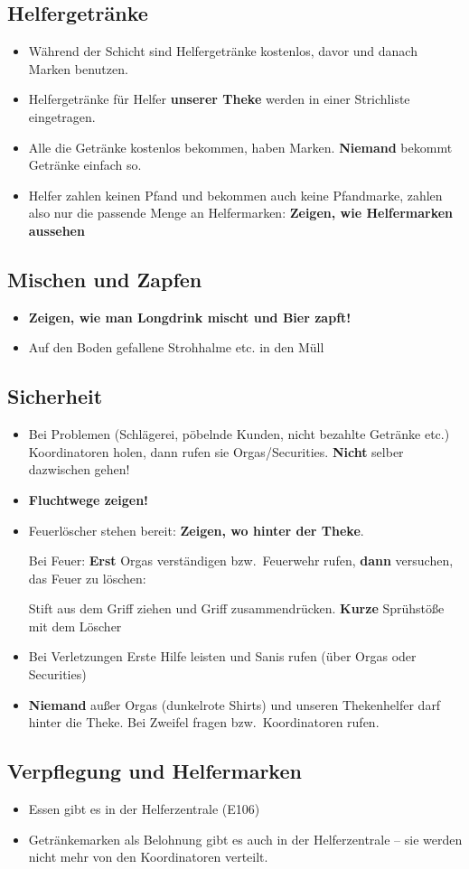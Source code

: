 \subsection{Helfergetränke}
\begin{itemize}
  \renewcommand{\labelitemi}{$\Box$}
  \item Während der Schicht sind Helfergetränke kostenlos, davor und danach Marken benutzen.
  \item Helfergetränke für Helfer \textbf{unserer Theke} werden in einer Strichliste eingetragen.
  \item Alle die Getränke kostenlos bekommen, haben Marken. \textbf{Niemand} bekommt Getränke einfach so.
  \item Helfer zahlen keinen Pfand und bekommen auch keine Pfandmarke, zahlen also nur die passende Menge an Helfermarken: \textbf{Zeigen, wie Helfermarken aussehen}
\end{itemize}
\subsection{Mischen und Zapfen}
\begin{itemize}
  \renewcommand{\labelitemi}{$\Box$}
  \item \textbf{Zeigen, wie man Longdrink mischt und Bier zapft!}
  \item Auf den Boden gefallene Strohhalme etc. in den Müll
\end{itemize}
\subsection{Sicherheit}
\begin{itemize}
  \renewcommand{\labelitemi}{$\Box$}
  \item Bei Problemen (Schlägerei, pöbelnde Kunden, nicht bezahlte Getränke etc.) Koordinatoren holen, dann rufen sie Orgas/Securities. \textbf{Nicht} selber dazwischen gehen!
  \item \textbf{Fluchtwege zeigen!}
  \item Feuerlöscher stehen bereit: \textbf{Zeigen, wo hinter der Theke}.
    
    Bei Feuer: \textbf{Erst} Orgas verständigen bzw.\ Feuerwehr rufen, \textbf{dann} versuchen, das Feuer zu löschen:
    
    Stift aus dem Griff ziehen und Griff zusammendrücken. \textbf{Kurze} Sprühstöße mit dem Löscher
  \item Bei Verletzungen Erste Hilfe leisten und Sanis rufen (über Orgas oder Securities)
  \item \textbf{Niemand} außer Orgas (dunkelrote Shirts) und unseren Thekenhelfer darf hinter die Theke. Bei Zweifel fragen bzw.\ Koordinatoren rufen.
\end{itemize}
\subsection{Verpflegung und Helfermarken}
\begin{itemize}
  \item Essen gibt es in der Helferzentrale (E106)
  \item Getränkemarken als Belohnung gibt es auch in der Helferzentrale -- sie werden nicht mehr von den Koordinatoren verteilt.
\end{itemize}
